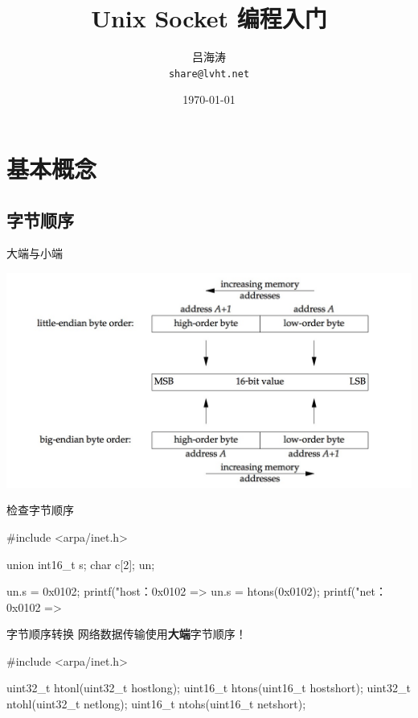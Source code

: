 \documentclass[UTF8]{beamer}
\title{Unix Socket 编程入门}
\author{吕海涛 \\ \texttt{share@lvht.net}}
\date{\today}
\begin{document}
\begin{frame}
  \titlepage
\end{frame}
\section{基本概念}
\subsection{字节顺序}
\begin{frame}{大端与小端}
  \centerline{\includegraphics[width=\textwidth]{img/byte-order.png}}
\end{frame}
\begin{frame}[fragile]{检查字节顺序}
  \begin{ccode}
    #include <arpa/inet.h>

    union { int16_t s; char c[2]; } un;

    un.s = 0x0102;
    printf("host：0x0102 => %
    un.s = htons(0x0102);
    printf("net：0x0102 => %
  \end{ccode}
\end{frame}
\begin{frame}[fragile]{字节顺序转换}
  网络数据传输使用\textbf{大端}字节顺序！
  \begin{ccode}
     #include <arpa/inet.h>

     uint32_t htonl(uint32_t hostlong);
     uint16_t htons(uint16_t hostshort);
     uint32_t ntohl(uint32_t netlong);
     uint16_t ntohs(uint16_t netshort);
  \end{ccode}
\end{frame}
\end{document}
